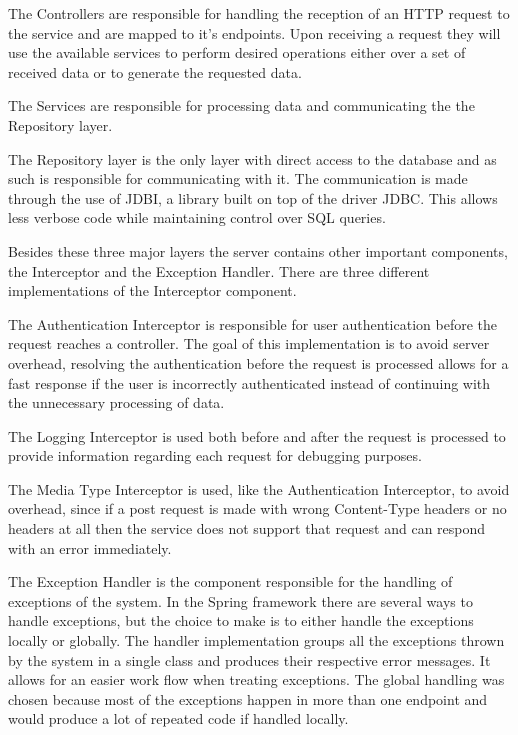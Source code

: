 The Controllers are responsible for handling the reception of an HTTP request to the service and are mapped to
it's endpoints. Upon receiving a request they will use the available services to perform desired operations either
over a set of received data or to generate the requested data.

The Services are responsible for processing data and communicating the the Repository layer.

The Repository layer is the only layer with direct access to the database and as such is responsible for communicating
with it. The communication is made through the use of JDBI\cite{jdbidocs}, a library built on top of the driver JDBC\cite{jdbcdocs}. This allows
less verbose code while maintaining control over SQL queries. 

Besides these three major layers the server contains other important components, the Interceptor\cite{springinterceptor} and the Exception Handler\cite{springexception}.
There are three different implementations of the Interceptor component.

The Authentication Interceptor is responsible for user authentication before the request reaches a controller. The goal of this
implementation is to avoid server overhead, resolving the authentication before the request is processed allows for a fast response
if the user is incorrectly authenticated instead of continuing with the unnecessary processing of data.

The Logging Interceptor is used both before and after the request is processed to provide information 
regarding each request for debugging purposes.

The Media Type Interceptor is used, like the Authentication Interceptor, to avoid overhead, since if a post request is made
with wrong Content-Type headers or no headers at all then the service does not support that request and can respond with an 
error immediately.

The Exception Handler is the component responsible for the handling of exceptions of the system. In the Spring framework there 
are several ways to handle exceptions, but the choice to make is to either handle the exceptions locally or globally. The 
handler implementation groups all the exceptions thrown by the system in a single class and produces their respective error 
messages. It allows for an easier work flow when treating exceptions. The global handling was chosen because most of the 
exceptions happen in more than one endpoint and would produce a lot of repeated code if handled locally.      

